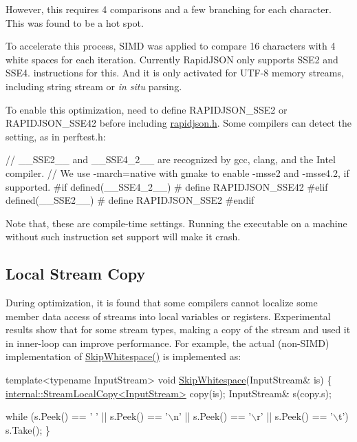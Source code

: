 However, this requires 4 comparisons and a few branching for each character. This was found to be a hot spot.

To accelerate this process, S\+I\+MD was applied to compare 16 characters with 4 white spaces for each iteration. Currently Rapid\+J\+S\+ON only supports S\+S\+E2 and S\+S\+E4. instructions for this. And it is only activated for U\+T\+F-\/8 memory streams, including string stream or {\itshape in situ} parsing.

To enable this optimization, need to define {\ttfamily R\+A\+P\+I\+D\+J\+S\+O\+N\+\_\+\+S\+S\+E2} or {\ttfamily R\+A\+P\+I\+D\+J\+S\+O\+N\+\_\+\+S\+S\+E42} before including {\ttfamily \hyperlink{rapidjson_8h}{rapidjson.\+h}}. Some compilers can detect the setting, as in {\ttfamily perftest.\+h}\+:


\begin{DoxyCode}
\textcolor{comment}{// \_\_SSE2\_\_ and \_\_SSE4\_2\_\_ are recognized by gcc, clang, and the Intel compiler.}
\textcolor{comment}{// We use -march=native with gmake to enable -msse2 and -msse4.2, if supported.}
\textcolor{preprocessor}{#if defined(\_\_SSE4\_2\_\_)}
\textcolor{preprocessor}{#  define RAPIDJSON\_SSE42}
\textcolor{preprocessor}{#elif defined(\_\_SSE2\_\_)}
\textcolor{preprocessor}{#  define RAPIDJSON\_SSE2}
\textcolor{preprocessor}{#endif}
\end{DoxyCode}


Note that, these are compile-\/time settings. Running the executable on a machine without such instruction set support will make it crash.\hypertarget{md_Commun_Externe_RapidJSON_doc_internals_LocalStreamCopy}{}\subsection{Local Stream Copy}\label{md_Commun_Externe_RapidJSON_doc_internals_LocalStreamCopy}
During optimization, it is found that some compilers cannot localize some member data access of streams into local variables or registers. Experimental results show that for some stream types, making a copy of the stream and used it in inner-\/loop can improve performance. For example, the actual (non-\/\+S\+I\+MD) implementation of {\ttfamily \hyperlink{reader_8h_a60338858b2582eca23f3e509a2d82e0e}{Skip\+Whitespace()}} is implemented as\+:


\begin{DoxyCode}
\textcolor{keyword}{template}<\textcolor{keyword}{typename} InputStream>
\textcolor{keywordtype}{void} \hyperlink{reader_8h_a60338858b2582eca23f3e509a2d82e0e}{SkipWhitespace}(InputStream& is) \{
    \hyperlink{classinternal_1_1_stream_local_copy}{internal::StreamLocalCopy<InputStream>} copy(is);
    InputStream& s(copy.s);

    \textcolor{keywordflow}{while} (s.Peek() == \textcolor{charliteral}{' '} || s.Peek() == \textcolor{charliteral}{'\(\backslash\)n'} || s.Peek() == \textcolor{charliteral}{'\(\backslash\)r'} || s.Peek() == \textcolor{charliteral}{'\(\backslash\)t'})
        s.Take();
\}
\end{DoxyCode}


